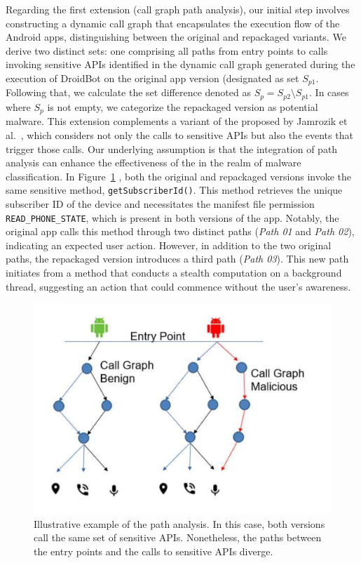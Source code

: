 Regarding the first extension (call graph path analysis), our initial step involves constructing a
dynamic call graph that encapsulates the execution flow of the Android apps,
distinguishing between the original and repackaged variants. We derive two distinct sets:
one comprising all paths from entry points to calls invoking sensitive APIs identified in the dynamic call graph generated during the execution of
DroidBot on the original app version (designated as set $S_{p1}$.
Following that, we calculate the set difference denoted as $S_p = S_{p2} \setminus S_{p1}$.
In cases where $S_p$ is not empty, we categorize the repackaged version as potential malware.
This extension complements a variant of the \mas proposed by Jamrozik et al.~\cite{DBLP:conf/icse/JamrozikSZ16},
which considers not only the calls to sensitive APIs but also the events that trigger those calls.
Our underlying assumption is that the integration of path analysis can enhance the effectiveness of
the \mas in the realm of malware classification.
In Figure~\ref{fig:callGraph} , both the original and repackaged
versions invoke the same sensitive method, \texttt{getSubscriberId()}.
This method retrieves the unique subscriber ID of the device and necessitates the manifest file
permission \texttt{READ\_PHONE\_STATE}, which is present in both versions of the app.
Notably, the original app calls this method through two distinct paths (\emph{Path 01} and \emph{Path 02}),
indicating an expected user action. However, in addition to the two original paths,
the repackaged version introduces a third path (\emph{Path 03}). This new path initiates
from a method that conducts a stealth computation on a background thread, suggesting an action that could
commence without the user's awareness.


\begin{figure}[ht]
\centering
\includegraphics[scale=0.30]{images/maliciousCallGraph.pdf}
\caption{Illustrative example of the path analysis. In this case, both versions call the same set of sensitive APIs. Nonetheless,
the paths between the entry points and the calls to sensitive APIs diverge.}
 \label{fig:callGraph}
\end{figure}

